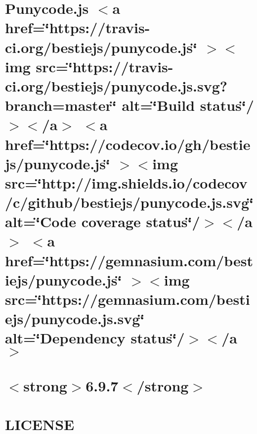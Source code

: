 \documentclass[twoside]{book}
\newcommand{\+}{\discretionary{\mbox{\scriptsize$\hookleftarrow$}}{}{}}
\begin{document}
\chapter{Punycode.\+js \texorpdfstring{$<$}{<}a href=\char`\"{}https\+://travis-\/ci.\+org/bestiejs/punycode.\+js\char`\"{} \texorpdfstring{$>$}{>}\texorpdfstring{$<$}{<}img src=\char`\"{}https\+://travis-\/ci.\+org/bestiejs/punycode.\+js.\+svg?branch=master\char`\"{} alt=\char`\"{}\+Build status\char`\"{}/\texorpdfstring{$>$}{>}\texorpdfstring{$<$}{<}/a\texorpdfstring{$>$}{>} \texorpdfstring{$<$}{<}a href=\char`\"{}https\+://codecov.\+io/gh/bestiejs/punycode.\+js\char`\"{} \texorpdfstring{$>$}{>}\texorpdfstring{$<$}{<}img src=\char`\"{}http\+://img.\+shields.\+io/codecov/c/github/bestiejs/punycode.\+js.\+svg\char`\"{} alt=\char`\"{}\+Code coverage status\char`\"{}/\texorpdfstring{$>$}{>}\texorpdfstring{$<$}{<}/a\texorpdfstring{$>$}{>} \texorpdfstring{$<$}{<}a href=\char`\"{}https\+://gemnasium.\+com/bestiejs/punycode.\+js\char`\"{} \texorpdfstring{$>$}{>}\texorpdfstring{$<$}{<}img src=\char`\"{}https\+://gemnasium.\+com/bestiejs/punycode.\+js.\+svg\char`\"{} alt=\char`\"{}\+Dependency status\char`\"{}/\texorpdfstring{$>$}{>}\texorpdfstring{$<$}{<}/a\texorpdfstring{$>$}{>}}
\label{md__c___users_vaishnavi_jadhav__desktop__developer_code_mean_stack_example_client_node_modules_punycode__r_e_a_d_m_e}

\chapter{\texorpdfstring{$<$}{<}strong\texorpdfstring{$>$}{>}6.9.7\texorpdfstring{$<$}{<}/strong\texorpdfstring{$>$}{>}}
\label{md__c___users_vaishnavi_jadhav__desktop__developer_code_mean_stack_example_client_node_modules_qs__c_h_a_n_g_e_l_o_g}

\chapter{LICENSE}
\label{md__c___users_vaishnavi_jadhav__desktop__developer_code_mean_stack_example_client_node_modules_qs__l_i_c_e_n_s_e}

\end{document}
